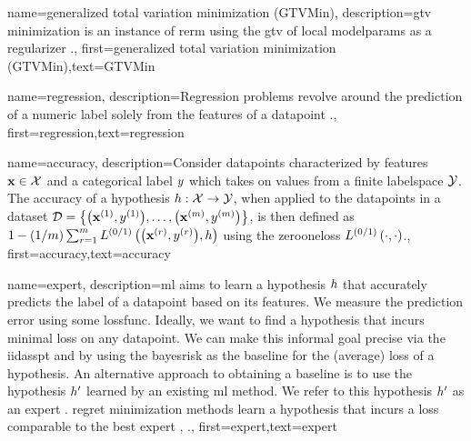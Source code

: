 {name={generalized total variation minimization (GTVMin)},
	description={\gls{gtv} minimization is an instance of \gls{rerm} 
		using the \gls{gtv} of local \gls{modelparams} as a \gls{regularizer} \cite{ClusteredFLTVMinTSP}.},
	first={generalized total variation minimization (GTVMin)},text={GTVMin} 
}

{name={regression},
	description={Regression problems revolve around the 
		prediction of a numeric \gls{label} solely from the \gls{feature}s of a \gls{datapoint} \cite[Ch. 2]{MLBasics}.},
	first={regression},text={regression} 
}

{name={accuracy},
	description={Consider \gls{datapoint}s characterized by \gls{feature}s ${\bf x} \in \mathcal{X}$ and 
		a categorical label $y$ which takes on values from a finite \gls{labelspace} $\mathcal{Y}$. The 
		accuracy of a \gls{hypothesis} $h: \mathcal{X} \rightarrow \mathcal{Y}$, when applied 
		to the \gls{datapoint}s in a \gls{dataset} $\mathcal{D} = \big\{ \big({\bf x}^{(1)}, y^{(1)} \big), \ldots, \big({\bf x}^{(m)},y^{(m)}\big) \big\}$, 
		is then defined as $1 - (1/m)\sum_{r=1}^{m} L^{(0/1)}\left(\big({\bf x}^{(r)},y^{(r)}\big),h \right)$ using the \gls{zerooneloss} $L^{(0/1)}\left(\cdot,\cdot \right)$.},
	first={accuracy},text={accuracy} 
}





{name={expert},
	description={\gls{ml} aims to learn a \gls{hypothesis} $h$ that accurately predicts the \gls{label} 
		of a \gls{datapoint} based on its \gls{feature}s. We measure the \gls{prediction} error using 
		some \gls{lossfunc}. Ideally, we want to find a \gls{hypothesis} that incurs minimal \gls{loss} 
		on any \gls{datapoint}. We can make this informal goal precise via the \gls{iidasspt} 
		and by using the \gls{bayesrisk} as the \gls{baseline} for the (average) \gls{loss} of a \gls{hypothesis}. 
		An alternative approach to obtaining a \gls{baseline} is to use the \gls{hypothesis} $h'$ learned 
		by an existing \gls{ml} method. We refer to this \gls{hypothesis} $h'$ as an expert \cite{PredictionLearningGames}. \Gls{regret} minimization methods learn a \gls{hypothesis}
		that incurs a \gls{loss} comparable to the best expert \cite{PredictionLearningGames}, \cite{HazanOCO}.},
	first={expert},text={expert} 
}


